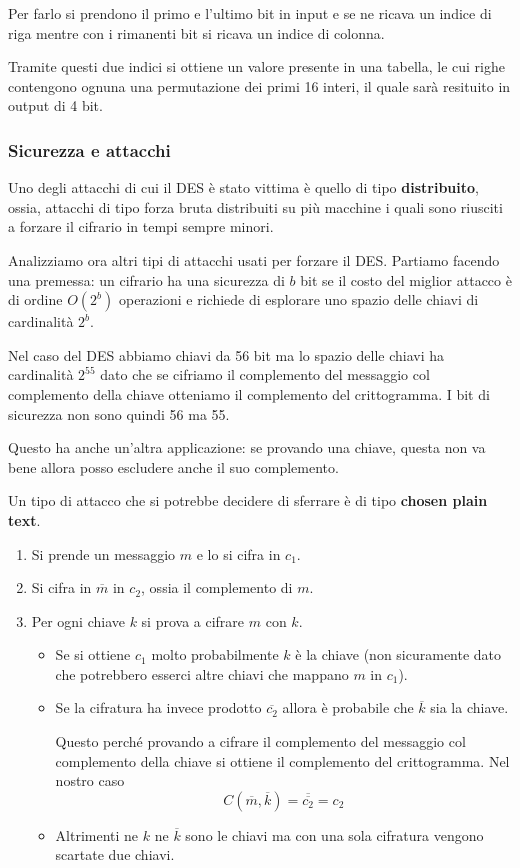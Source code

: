 Per farlo si prendono il primo e l'ultimo bit in input e se ne ricava un indice di riga mentre con i rimanenti bit
si ricava un indice di colonna.

Tramite questi due indici si ottiene un valore presente in una tabella, le cui righe contengono ognuna una permutazione
dei primi 16 interi, il quale sar\`a resituito in output di 4 bit.

\subsubsection{Sicurezza e attacchi}
Uno degli attacchi di cui il DES \`e stato vittima \`e quello di tipo \textbf{distribuito}, ossia, attacchi di tipo
forza bruta distribuiti su pi\`u macchine i quali sono riusciti a forzare il cifrario in tempi sempre minori.

Analizziamo ora altri tipi di attacchi usati per forzare il DES. Partiamo facendo una premessa: un cifrario ha una
sicurezza di $b$ bit se il costo del miglior attacco \`e di ordine $O(2^b)$ operazioni e richiede di esplorare uno
spazio delle chiavi di cardinalit\`a $2^b$.

Nel caso del DES abbiamo chiavi da 56 bit ma lo spazio delle chiavi ha cardinalit\`a $2^{55}$ dato che se cifriamo
il complemento del messaggio col complemento della chiave otteniamo il complemento del crittogramma. I bit di sicurezza
non sono quindi 56 ma 55.

Questo ha anche un'altra applicazione: se provando una chiave, questa non va bene allora posso escludere anche il suo
complemento.

Un tipo di attacco che si potrebbe decidere di sferrare \`e di tipo \textbf{chosen plain text}.
\begin{enumerate}
	\item Si prende un messaggio $m$ e lo si cifra in $c_1$.
	\item Si cifra in $\overline{m}$ in $c_2$, ossia il complemento di $m$.
	\item Per ogni chiave $k$ si prova a cifrare $m$ con $k$.
	      \begin{itemize}
		      \item Se si ottiene $c_1$ molto probabilmente $k$ \`e la chiave (non sicuramente dato che potrebbero
		            esserci altre chiavi che mappano $m$ in $c_1$).
		      \item Se la cifratura ha invece prodotto $\overline{c_2}$ allora \`e probabile che $\overline{k}$ sia
		            la chiave.

		            Questo perch\'e provando a cifrare il complemento del messaggio col complemento della chiave si
		            ottiene il complemento del crittogramma. Nel nostro caso
		            \[ C(\overline{m}, \overline{k}) = \overline{\overline{c_2}} = c_2 \]
		      \item Altrimenti ne $k$ ne $\overline{k}$ sono le chiavi ma con una sola cifratura vengono scartate
		            due chiavi.
	      \end{itemize}
\end{enumerate}


